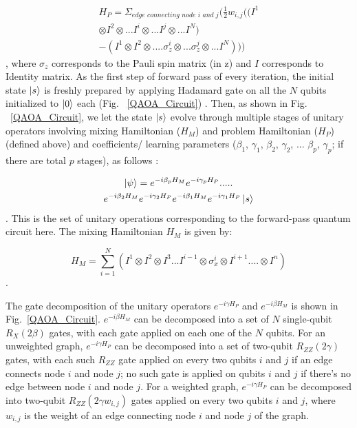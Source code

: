 \documentclass[%
 reprint,
 amsmath,amssymb,
 aps,
]{revtex4-2}
\begin{document}
\vspace{-2em}
\begin{multline}
H_P= \Sigma_{\textit{edge connecting node i and j}}(\frac{1}{2}w_{i,j}((I^{1} \\
\otimes I^{2} \otimes ... I^{i}\otimes...I^{j}\otimes...I^{N}) \\
-(I^{1} \otimes I^{2} \otimes .... \sigma_z^{i}\otimes ...\sigma_z^{j}\otimes... I^{N})))
\label{QAOA_Hp}
\end{multline}, 
where $\sigma_z$ corresponds to the Pauli spin matrix (in z) and $I$ corresponds to Identity matrix. As the first step of forward pass of every iteration, the initial state $\ket{s}$ is freshly prepared by applying Hadamard gate on all the $N$ qubits initialized to $\ket{0}$ each (Fig. ~\ref{QAOA_Circuit}) \citep{QAOA_Tutorial}. Then, as shown in Fig. ~\ref{QAOA_Circuit}, we let the state $\ket{s}$ evolve through multiple stages of unitary operators involving mixing Hamiltonian ($H_M$) and problem Hamiltonian ($H_P$) (defined above) and coefficients/ learning parameters ($\beta_1$, $\gamma_1$, $\beta_2$, $\gamma_2$, ... $\beta_p$, $\gamma_p$; if there are total $p$ stages), as follows \citep{QAOA_Farhi, QAOA_Tutorial}: 

\begin{multline}
    \ket{\psi}=e^{-i\beta_pH_M}e^{-i\gamma_pH_P}.....\\
    e^{-i\beta_2H_M}e^{-i\gamma_2H_P}e^{-i\beta_1H_M}e^{-i\gamma_1H_P} \ket{s}
    \label{QAOA_evol}
\end{multline}. This is the set of unitary operations corresponding to the forward-pass quantum circuit here. The mixing Hamiltonian $H_M$ is given by: 

\begin{equation}
H_M=\sum _{i=1}^{N}(I^{1}\otimes I^{2} \otimes I^{3}...I^{i-1} \otimes \sigma _{x}^{i}\otimes I^{i+1}....\otimes I^{n})
\label{QAOA_Hm}
\end{equation}. 

The gate decomposition of the unitary operators $e^{-i\gamma H_P}$ and $e^{-i\beta H_M}$ is shown in Fig.~\ref{QAOA_Circuit}. $e^{-i\beta H_M}$  can be decomposed into a set of $N$ single-qubit $R_X(2\beta)$ gates, with each gate applied on each one of the $N$ qubits. For an unweighted graph, $e^{-i\gamma H_P}$ can be decomposed into a set of two-qubit $R_{ZZ}(2\gamma)$ gates, with each such $R_{ZZ}$ gate applied on every two qubits $i$ and $j$ if an edge connects node $i$ and node $j$; no such gate is applied on qubits $i$ and $j$ if there's no edge between node $i$ and node $j$. For a weighted graph, $e^{-i\gamma H_P}$ can be decomposed into two-qubit $R_{ZZ}(2\gamma w_{i,j})$ gates applied on every two qubits $i$ and $j$, where $w_{i,j}$ is the weight of an edge connecting node $i$ and node $j$ of the graph.
\end{document}
